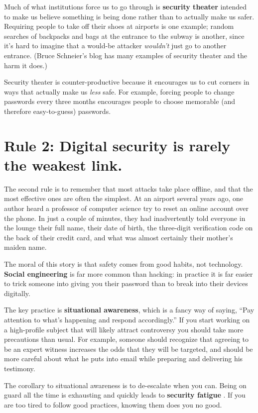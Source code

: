 \documentclass[10pt,letterpaper]{article}
\begin{document}
Much of what institutions force us to go through is \textbf{security theater}
intended to make us believe something is being done rather than to actually make
us safer. Requiring people to take off their shoes at airports is one example;
random searches of backpacks and bags at the entrance to the subway is another,
since it's hard to imagine that a would-be attacker \emph{wouldn't} just go to
another entrance. (Bruce Schneier's blog \cite{SchnBlog} has many examples of
security theater and the harm it does.)

Security theater is counter-productive because it encourages us to cut corners
in ways that actually make us \emph{less} safe. For example, forcing people to
change passwords every three months encourages people to choose memorable (and
therefore easy-to-guess) passwords.

\section*{Rule 2: Digital security is rarely the weakest link.}

The second rule is to remember that most attacks take place offline, and that
the most effective ones are often the simplest. At an airport several years ago,
one author heard a professor of computer science try to reset an online account
over the phone. In just a couple of minutes, they had inadvertently told
everyone in the lounge their full name, their date of birth, the three-digit
verification code on the back of their credit card, and what was almost
certainly their mother's maiden name.

The moral of this story is that safety comes from good habits, not technology.
\textbf{Social engineering} is far more common than hacking: in practice it is
far easier to trick someone into giving you their password than to break into
their devices digitally.

The key practice is \textbf{situational awareness}, which is a fancy way of
saying, ``Pay attention to what's happening and respond accordingly.'' If you
start working on a high-profile subject that will likely attract controversy you
should take more precautions than usual. For example, someone should recognize
that agreeing to be an expert witness increases the odds that they will be
targeted, and should be more careful about what he puts into email while
preparing and delivering his testimony.

The corollary to situational awareness is to de-escalate when you can.  Being on
guard all the time is exhausting and quickly leads to \textbf{security fatigue}
\cite{Stan2016}. If you are too tired to follow good practices, knowing them does
you no good.
\end{document}
